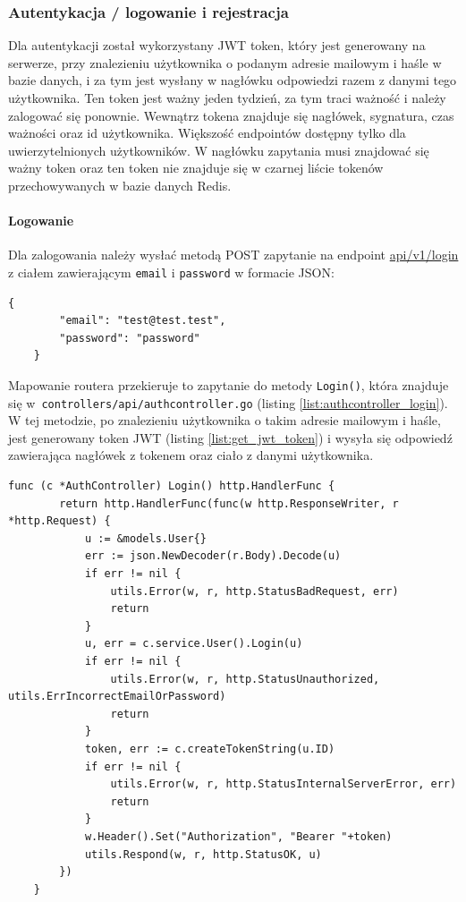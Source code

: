 \subsubsection{Autentykacja / logowanie i rejestracja}
\label{sec:autentykacja}
Dla autentykacji został wykorzystany JWT token, który jest generowany na serwerze, przy znalezieniu użytkownika o podanym adresie mailowym i haśle w bazie danych, i za tym jest wysłany w nagłówku odpowiedzi razem z danymi tego użytkownika.
Ten token jest ważny jeden tydzień, za tym traci ważność i należy zalogować się ponownie. Wewnątrz tokena znajduje się nagłówek, sygnatura, czas ważności oraz id użytkownika.
Większość endpointów dostępny tylko dla uwierzytelnionych użytkowników. W nagłówku zapytania musi znajdować się ważny token oraz ten token nie znajduje się w czarnej liście tokenów przechowywanych w bazie danych Redis.

\paragraph{Logowanie\newline}
Dla zalogowania należy wysłać metodą POST zapytanie na endpoint \url{api/v1/login} z ciałem zawierającym \texttt{email} i \texttt{password} w formacie JSON:
\begin{lstlisting}[basicstyle=\tiny\ttfamily]
    {
        "email": "test@test.test",
        "password": "password"
    }
\end{lstlisting}

Mapowanie routera przekieruje to zapytanie do metody \texttt{Login()}, która znajduje się w~\texttt{controllers/api/authcontroller.go} (listing \ref{list:authcontroller_login}).
W tej metodzie, po znalezieniu użytkownika o takim adresie mailowym i haśle, jest generowany token JWT (listing \ref{list:get_jwt_token}) i wysyła się odpowiedź zawierająca nagłówek z tokenem oraz ciało z danymi użytkownika.
\begin{lstlisting}[label=list:authcontroller_login,caption=Kontroller logowania użytkownika,basicstyle=\tiny\ttfamily]
    func (c *AuthController) Login() http.HandlerFunc {
        return http.HandlerFunc(func(w http.ResponseWriter, r *http.Request) {
            u := &models.User{}
            err := json.NewDecoder(r.Body).Decode(u)
            if err != nil {
                utils.Error(w, r, http.StatusBadRequest, err)
                return
            }
            u, err = c.service.User().Login(u)
            if err != nil {
                utils.Error(w, r, http.StatusUnauthorized, utils.ErrIncorrectEmailOrPassword)
                return
            }
            token, err := c.createTokenString(u.ID)
            if err != nil {
                utils.Error(w, r, http.StatusInternalServerError, err)
                return
            }
            w.Header().Set("Authorization", "Bearer "+token)
            utils.Respond(w, r, http.StatusOK, u)
        })
    }
\end{lstlisting}

